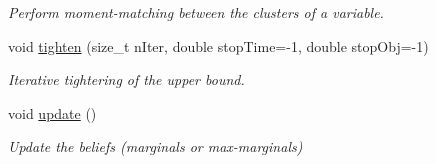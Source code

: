 \begin{DoxyCompactItemize}
\begin{DoxyCompactList}\small\item\em Perform moment-\/matching between the clusters of a variable. \end{DoxyCompactList}\item 
\hypertarget{classmerlin_1_1wmb_a5ef13c682161de26ab1f89b3719e69e3}{}void \hyperlink{classmerlin_1_1wmb_a5ef13c682161de26ab1f89b3719e69e3}{tighten} (size\+\_\+t n\+Iter, double stop\+Time=-\/1, double stop\+Obj=-\/1)\label{classmerlin_1_1wmb_a5ef13c682161de26ab1f89b3719e69e3}

\begin{DoxyCompactList}\small\item\em Iterative tightering of the upper bound. \end{DoxyCompactList}\item 
\hypertarget{classmerlin_1_1wmb_a761421a2ad5cd8bcba09a69b7e9713a6}{}void \hyperlink{classmerlin_1_1wmb_a761421a2ad5cd8bcba09a69b7e9713a6}{update} ()\label{classmerlin_1_1wmb_a761421a2ad5cd8bcba09a69b7e9713a6}

\begin{DoxyCompactList}\small\item\em Update the beliefs (marginals or max-\/marginals) \end{DoxyCompactList}\end{DoxyCompactItemize}
